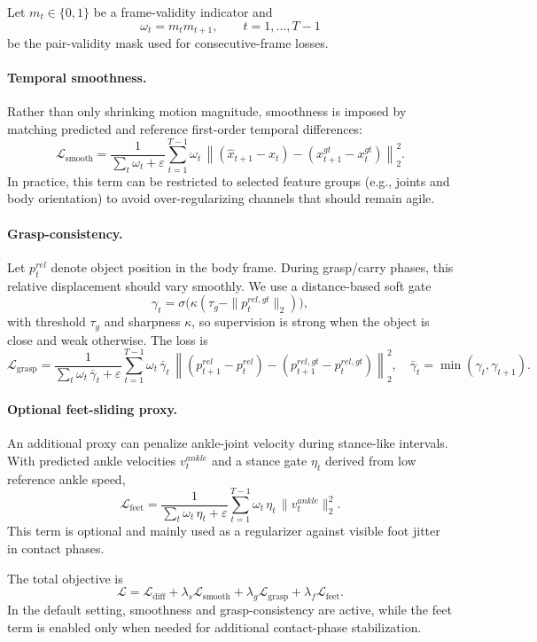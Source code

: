 Let $m_t\in\{0,1\}$ be a frame-validity indicator and
\[
\omega_t = m_t m_{t+1}, \qquad t=1,\dots,T-1
\]
be the pair-validity mask used for consecutive-frame losses.

\paragraph{Temporal smoothness.}
Rather than only shrinking motion magnitude, smoothness is imposed by matching predicted and reference first-order temporal differences:
\[
\mathcal{L}_{\mathrm{smooth}}=
\frac{1}{\sum_t \omega_t + \varepsilon}
\sum_{t=1}^{T-1}\omega_t\,
\left\| (\hat x_{t+1}-\hat x_t) - (x^{gt}_{t+1}-x^{gt}_t) \right\|_2^2.
\]
In practice, this term can be restricted to selected feature groups (e.g., joints and body orientation) to avoid over-regularizing channels that should remain agile.

\paragraph{Grasp-consistency.}
Let $p_t^{rel}$ denote object position in the body frame. During grasp/carry phases, this relative displacement should vary smoothly. We use a distance-based soft gate
\[
\gamma_t = \sigma\!\big(\kappa(\tau_g-\|p_t^{rel,gt}\|_2)\big),
\]
with threshold $\tau_g$ and sharpness $\kappa$, so supervision is strong when the object is close and weak otherwise. The loss is
\[
\mathcal{L}_{\mathrm{grasp}}=
\frac{1}{\sum_t\omega_t\,\bar\gamma_t+\varepsilon}
\sum_{t=1}^{T-1}
\omega_t\,\bar\gamma_t\,
\left\| (p_{t+1}^{rel}-p_t^{rel})-(p_{t+1}^{rel,gt}-p_t^{rel,gt}) \right\|_2^2,
\quad
\bar\gamma_t = \min(\gamma_t,\gamma_{t+1}).
\]

\paragraph{Optional feet-sliding proxy.}
An additional proxy can penalize ankle-joint velocity during stance-like intervals. With predicted ankle velocities $v_t^{ankle}$ and a stance gate $\eta_t$ derived from low reference ankle speed,
\[
\mathcal{L}_{\mathrm{feet}}=
\frac{1}{\sum_t\omega_t\,\eta_t+\varepsilon}
\sum_{t=1}^{T-1}\omega_t\,\eta_t\,\|v_t^{ankle}\|_2^2.
\]
This term is optional and mainly used as a regularizer against visible foot jitter in contact phases.

The total objective is
\[
\mathcal{L}=\mathcal{L}_{\mathrm{diff}}
+\lambda_s\mathcal{L}_{\mathrm{smooth}}
+\lambda_g\mathcal{L}_{\mathrm{grasp}}
+\lambda_f\mathcal{L}_{\mathrm{feet}}.
\]
In the default setting, smoothness and grasp-consistency are active, while the feet term is enabled only when needed for additional contact-phase stabilization.

